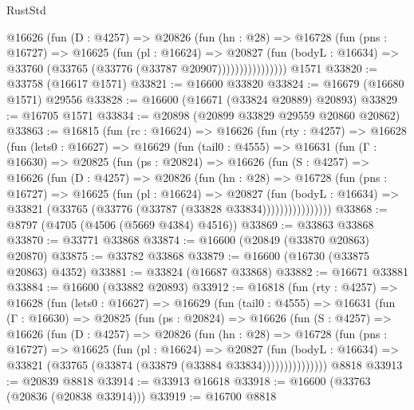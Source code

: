 \begin{lexlean}{RustStd}
\begin{coremodule}
                  @16626
                    (fun (D : @4257) =>
                    @20826
                      (fun (hn : @28) =>
                      @16728
                        (fun (pns : @16727) =>
                        @16625
                          (fun (pl : @16624) =>
                          @20827
                            (fun (bodyL : @16634) =>
                            @33760 (@33765 (@33776 (@33787 @20907))))))))))))))))
    @1571
@33820 := @33758 (@16617 @1571)
@33821 := @16600 @33820
@33824 := @16679 (@16680 @1571) @29556
@33828 := @16600 (@16671 (@33824 @20889) @20893)
@33829 := @16705 @1571
@33834 := @20898 (@20899 @33829 @29559 @20860 @20862)
@33863 := @16815
    (fun (rc : @16624) =>
    @16626
      (fun (rty : @4257) =>
      @16628
        (fun (lets0 : @16627) =>
        @16629
          (fun (tail0 : @4555) =>
          @16631
            (fun (Γ : @16630) =>
            @20825
              (fun (ps : @20824) =>
              @16626
                (fun (S : @4257) =>
                @16626
                  (fun (D : @4257) =>
                  @20826
                    (fun (hn : @28) =>
                    @16728
                      (fun (pns : @16727) =>
                      @16625
                        (fun (pl : @16624) =>
                        @20827
                          (fun (bodyL : @16634) =>
                          @33821 (@33765 (@33776 (@33787 (@33828 @33834))))))))))))))))
@33868 := @8797 (@4705 (@4506 (@5669 @4384) @4516))
@33869 := @33863 @33868
@33870 := @33771 @33868
@33874 := @16600 (@20849 (@33870 @20863) @20870)
@33875 := @33782 @33868
@33879 := @16600 (@16730 (@33875 @20863) @4352)
@33881 := @33824 (@16687 @33868)
@33882 := @16671 @33881
@33884 := @16600 (@33882 @20893)
@33912 := @16818
    (fun (rty : @4257) =>
    @16628
      (fun (lets0 : @16627) =>
      @16629
        (fun (tail0 : @4555) =>
        @16631
          (fun (Γ : @16630) =>
          @20825
            (fun (ps : @20824) =>
            @16626
              (fun (S : @4257) =>
              @16626
                (fun (D : @4257) =>
                @20826
                  (fun (hn : @28) =>
                  @16728
                    (fun (pns : @16727) =>
                    @16625
                      (fun (pl : @16624) =>
                      @20827
                        (fun (bodyL : @16634) =>
                        @33821 (@33765 (@33874 (@33879 (@33884 @33834)))))))))))))))
    @8818
@33913 := @20839 @8818
@33914 := @33913 @16618
@33918 := @16600 (@33763 (@20836 (@20838 @33914)))
@33919 := @16700 @8818

\end{coremodule}
\end{lexlean}
